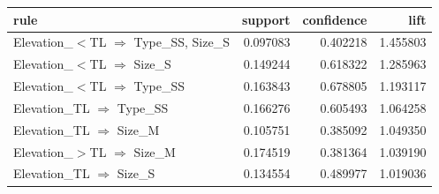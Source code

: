 \begin{tabular}{lrrr}
\toprule
rule & support & confidence & lift \\
\midrule
Elevation\_$<$TL $\Rightarrow$ Type\_SS, Size\_S & 0.097083 & 0.402218 & 1.455803 \\
Elevation\_$<$TL $\Rightarrow$ Size\_S & 0.149244 & 0.618322 & 1.285963 \\
Elevation\_$<$TL $\Rightarrow$ Type\_SS & 0.163843 & 0.678805 & 1.193117 \\
Elevation\_TL $\Rightarrow$ Type\_SS & 0.166276 & 0.605493 & 1.064258 \\
Elevation\_TL $\Rightarrow$ Size\_M & 0.105751 & 0.385092 & 1.049350 \\
Elevation\_$>$TL $\Rightarrow$ Size\_M & 0.174519 & 0.381364 & 1.039190 \\
Elevation\_TL $\Rightarrow$ Size\_S & 0.134554 & 0.489977 & 1.019036 \\
\bottomrule
\end{tabular}
